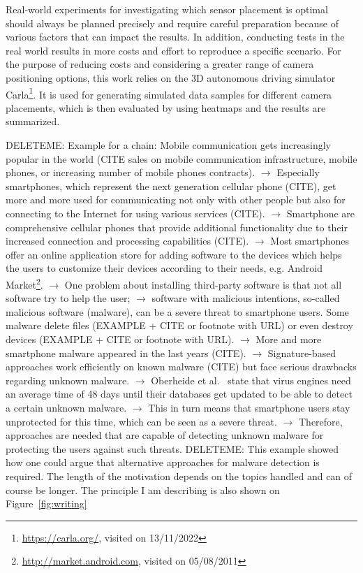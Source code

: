 Real-world experiments for investigating which sensor placement is optimal should always be planned precisely and require careful preparation because of various factors that can impact the results. In addition, conducting tests in the real world results in more costs and effort to reproduce a specific scenario. For the purpose of reducing costs and considering a greater range of camera positioning options, this work relies on the 3D autonomous driving simulator Carla\footnote{\url{https://carla.org/}, visited on 13/11/2022}. It is used for generating simulated data samples for different camera placements, which is then evaluated by using heatmaps and the results are summarized.

DELETEME: Example for a chain: Mobile communication gets increasingly popular in the world (CITE sales on mobile communication infrastructure, mobile phones, or increasing number of mobile phones contracts). $\rightarrow$ Especially smartphones, which represent the next generation cellular phone (CITE), get more and more used for communicating not only with other people but also for connecting to the Internet for using various services (CITE). $\rightarrow$ Smartphone are comprehensive cellular phones that provide additional functionality due to their increased connection and processing capabilities (CITE). $\rightarrow$ Most smartphones offer an online application store for adding software to the devices which helps the users to customize their devices according to their needs, e.g. Android Market\footnote{\url{http://market.android.com}, visited on 05/08/2011}. $\rightarrow$ One problem about installing third-party software is that not all software try to help the user; $\rightarrow$ software with malicious intentions, so-called malicious software (malware), can be a severe threat to smartphone users. Some malware delete files (EXAMPLE + CITE or footnote with URL) or even destroy devices (EXAMPLE + CITE or footnote with URL). $\rightarrow$ More and more smartphone malware appeared in the last years (CITE). $\rightarrow$ Signature-based approaches work efficiently on known malware (CITE) but face serious drawbacks regarding unknown malware. $\rightarrow$ Oberheide et al.~\cite{oberheide:2008:cloudav} state that virus engines need an average time of 48 days until their databases get updated to be able to detect a certain unknown malware. $\rightarrow$ This in turn means that smartphone users stay unprotected for this time, which can be seen as a severe threat. $\rightarrow$ Therefore, approaches are needed that are capable of detecting unknown malware for protecting the users against such threats.
DELETEME: This example showed how one could argue that alternative approaches for malware detection is required. The length of the motivation depends on the topics handled and can of course be longer. The principle I am describing is also shown on Figure~\ref{fig:writing}

